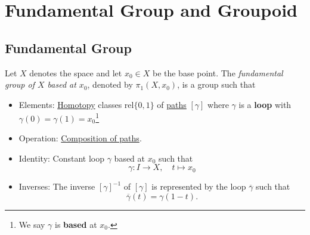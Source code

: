 \section{Fundamental Group and Groupoid}
\subsection{Fundamental Group}
\begin{definition}\label{def:fundamental-group}
	Let \(X\) denotes the space and let \(x_0\in X\) be the base point. The \emph{fundamental group of \(X\) based at \(x_0\)},
	denoted by \(\pi_1(X, x_0)\), is a group such that
	\begin{itemize}
		\item Elements: \hyperref[def:homotopy]{Homotopy} classes \(\mathrm{rel} \{0, 1\}\) of \hyperref[def:path]{paths} \([\gamma]\) where \(\gamma\) is a \textbf{loop}
		      with \(\gamma(0) = \gamma(1) = x_0\)\footnote{We say \(\gamma\) is \textbf{based} at \(x_0\).}
		      \begin{figure}[H]
			      \centering
			      \label{fig:def:fundamental-group-elements}
		      \end{figure}
		\item Operation: \hyperref[def:path-composition]{Composition of paths}.
		\item Identity: Constant loop \(\gamma\) based at \(x_0\) such that
		      \[
			      \gamma\colon I\to X,\quad t\mapsto x_0
		      \]
		\item Inverses: The inverse \([\gamma]^{-1}\) of \([\gamma]\) is represented by the loop \(\overline{\gamma}\) such that
		      \[
			      \overline{\gamma} (t) = \gamma(1-t).
		      \]
		      \begin{figure}[H]
			      \centering
			      \label{fig:def:fundamental-group-inverses}
		      \end{figure}
	\end{itemize}
\end{definition}
